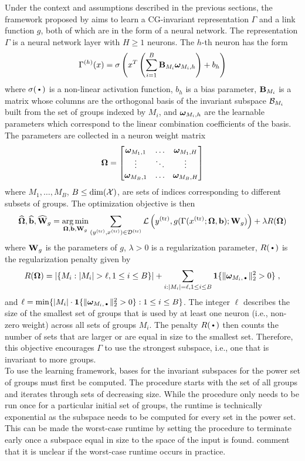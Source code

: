Under the context and assumptions described in the previous sections, the framework proposed by \textcite{Mouli:2021} aims to learn a CG-invariant representation $\Gamma$ and a link function $g$, both of which are in the form of a neural network. The representation $\Gamma$ is a neural network layer with $H\geq1$ neurons. The $h$-th neuron has the form
\[
\Gamma^{(h)}(x) = \sigma\left(x^T\left(\sum_{i=1}^B\mathbf{B}_{M_i}\bm{\omega}_{M_i,h}\right)+b_h\right)
\]
where $\sigma(\argdot)$ is a non-linear activation function, $b_h$ is a bias parameter, $\mathbf{B}_{M_i}$ is a matrix whose columns are the orthogonal basis of the invariant subspace $\mathcal{B}_{M_i}$ built from the set of groups indexed by $M_i$, and $\bm{\omega}_{M_i,h}$ are the learnable parameters which correspond to the linear combination coefficients of the basis. The parameters are collected in a neuron weight matrix
\[
\bm{\Omega} =
\begin{bmatrix}
\bm{\omega}_{M_1,1} & \ldots & \bm{\omega}_{M_1,H} \\
\vdots & \ddots & \vdots \\
\bm{\omega}_{M_B,1} & \ldots & \bm{\omega}_{M_B,H}
\end{bmatrix}
\]
where $M_1,\ldots,M_B$, $B\leq \mathrm{dim}(\mathcal{X})$, are sets of indices corresponding to different subsets of groups. The optimization objective is then
\[
\widehat{\bm{\Omega}},\widehat{\mathbf{b}},\widehat{\mathbf{W}}_g = \operatorname*{arg\,min}_{\bm{\Omega},\mathbf{b},\mathbf{W}_g}\sum_{(y^\text{(tr)},x^\text{(tr)})\in\mathcal{D}^\text{(tr)}}\mathcal{L}\left(y^\text{(tr)},g(\Gamma(x^\text{(tr)};\bm{\Omega},\mathbf{b});\mathbf{W}_g)\right)+ \lambda R(\bm{\Omega})
\]
where $\mathbf{W}_g$ is the parameters of $g$, $\lambda>0$ is a regularization parameter, $R(\argdot)$ is the regularization penalty given by
\[
R(\bfOm) = \left|\{M_i:|M_i|>\ell, 1\leq i\leq B\}\right| + \sum_{i:|M_i|=\ell,1\leq i\leq B}\onevec\{\|\bfom_{M_i,\argdot}\|_2^2>0\}\;,
\]
and $\ell = \min\{|M_i|\cdot\onevec\{\|\bfom_{M_i,\argdot}\|_2^2>0\}: 1\leq i \leq B\}$. The integer $\ell$ describes the size of the smallest set of groups that is used by at least one neuron (i.e., non-zero weight) across all sets of groups $M_i$. The penalty $R(\argdot)$ then counts the number of sets that are larger or are equal in size to the smallest set. Therefore, this objective encourages $\Gamma$ to use the strongest subspace, i.e., one that is invariant to more groups.
\\

To use the learning framework, bases for the invariant subspaces for the power set of groups must first be computed. The procedure starts with the set of all groups and iterates through sets of decreasing size. While the procedure only needs to be run once for a particular initial set of groups, the runtime is technically exponential as the subspace needs to be computed for every set in the power set. This can be made the worst-case runtime by setting the procedure to terminate early once a subspace equal in size to the space of the input is found. \textcite{Mouli:2021} comment that it is unclear if the worst-case runtime occurs in practice.
\\

